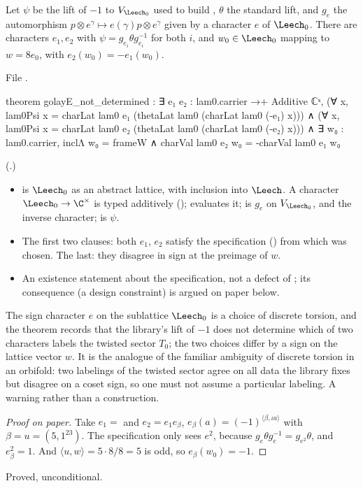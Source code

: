 \begin{theorem}\label{ch12:thm:golayE}
Let $\psi$ be the lift of $-1$ to $V_{\Leech_0}$ used to build , $\theta$ the standard lift,
and $g_e$ the automorphism $p\otimes e^\gamma\mapsto e(\gamma)p\otimes e^\gamma$ given by a character $e$ of
$\Leech_0$.  There are characters $e_1,e_2$ with $\psi=g_{e_i}\theta g_{e_i}^{-1}$ for both $i$, and
$w_0\in\Leech_0$ mapping to $w=8e_0$, with $e_2(w_0)=-e_1(w_0)$.
\end{theorem}
File .
\begin{leancode}
theorem golayE_not_determined :
    ∃ e₁ e₂ : lam0.carrier →+ Additive ℂˣ,
      (∀ x, lam0Psi x = charLat lam0 e₁ (thetaLat lam0 (charLat lam0 (-e₁) x))) ∧
      (∀ x, lam0Psi x = charLat lam0 e₂ (thetaLat lam0 (charLat lam0 (-e₂) x))) ∧
      ∃ w₀ : lam0.carrier, inclΛ w₀ = frameW ∧ charVal lam0 e₂ w₀ = -charVal lam0 e₁ w₀
\end{leancode}
(.)
\begin{dictionary}
\begin{itemize}
\item {} is $\Leech_0$ as an abstract lattice, with inclusion  into $\Leech$.  A character
  $\Leech_0\to\C^\times$ is typed additively ();  evaluates it;  is $g_e$ on $V_{\Leech_0}$, and  the inverse character;  is $\psi$.
\item The first two clauses: both $e_1$, $e_2$ satisfy the specification () from which
   was chosen.  The last: they disagree in sign at the preimage of $w$.
\item An existence statement about the specification, not a defect of ; its consequence (a
  design constraint) is argued on paper below.
\end{itemize}
\end{dictionary}

\begin{physics}
The sign character $e$ on the sublattice $\Leech_0$ is a choice of discrete torsion, and the theorem records that the library's lift of $-1$ does not determine which of two characters labels the twisted sector $T_0$; the two choices differ by a sign on the lattice vector $w$. It is the analogue of the familiar ambiguity of discrete torsion in an orbifold: two labelings of the twisted sector agree on all data the library fixes but disagree on a coset sign, so one must not assume a particular labeling. A warning rather than a construction.
\end{physics}
\begin{proof}[Proof on paper]
Take $e_1=$  and $e_2=e_1e_\beta$, $e_\beta(a)=(-1)^{\langle\beta,\iota a\rangle}$ with $\beta=u=(5,1^{23})$.
The specification only sees $e^2$, because $g_e\theta g_e^{-1}=g_{e^2}\theta$, and $e_\beta^2=1$.  And
$\langle u,w\rangle=5\cdot8/8=5$ is odd, so $e_\beta(w_0)=-1$.
\end{proof}
\begin{status}Proved, unconditional.\end{status}


